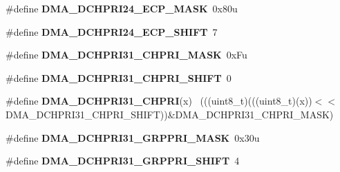 \begin{DoxyCompactItemize}
\item 
\hypertarget{group___d_m_a___register___masks_gab51b5933e6c790902a55a68be57c4868}{}\#define {\bfseries D\+M\+A\+\_\+\+D\+C\+H\+P\+R\+I24\+\_\+\+E\+C\+P\+\_\+\+M\+A\+S\+K}~0x80u\label{group___d_m_a___register___masks_gab51b5933e6c790902a55a68be57c4868}

\item 
\hypertarget{group___d_m_a___register___masks_gaa3c8611d55fcded011a0ee28f9ac3ae9}{}\#define {\bfseries D\+M\+A\+\_\+\+D\+C\+H\+P\+R\+I24\+\_\+\+E\+C\+P\+\_\+\+S\+H\+I\+F\+T}~7\label{group___d_m_a___register___masks_gaa3c8611d55fcded011a0ee28f9ac3ae9}

\item 
\hypertarget{group___d_m_a___register___masks_ga2bbb6a19ae9494615995153e17658fdd}{}\#define {\bfseries D\+M\+A\+\_\+\+D\+C\+H\+P\+R\+I31\+\_\+\+C\+H\+P\+R\+I\+\_\+\+M\+A\+S\+K}~0x\+Fu\label{group___d_m_a___register___masks_ga2bbb6a19ae9494615995153e17658fdd}

\item 
\hypertarget{group___d_m_a___register___masks_ga5eec89c278cd8c360303ef845fb68bb4}{}\#define {\bfseries D\+M\+A\+\_\+\+D\+C\+H\+P\+R\+I31\+\_\+\+C\+H\+P\+R\+I\+\_\+\+S\+H\+I\+F\+T}~0\label{group___d_m_a___register___masks_ga5eec89c278cd8c360303ef845fb68bb4}

\item 
\hypertarget{group___d_m_a___register___masks_gad8c6c7dced3065a9ceb4ce5485962e35}{}\#define {\bfseries D\+M\+A\+\_\+\+D\+C\+H\+P\+R\+I31\+\_\+\+C\+H\+P\+R\+I}(x)                                    ~(((uint8\+\_\+t)(((uint8\+\_\+t)(x))$<$$<$D\+M\+A\+\_\+\+D\+C\+H\+P\+R\+I31\+\_\+\+C\+H\+P\+R\+I\+\_\+\+S\+H\+I\+F\+T))\&D\+M\+A\+\_\+\+D\+C\+H\+P\+R\+I31\+\_\+\+C\+H\+P\+R\+I\+\_\+\+M\+A\+S\+K)\label{group___d_m_a___register___masks_gad8c6c7dced3065a9ceb4ce5485962e35}

\item 
\hypertarget{group___d_m_a___register___masks_ga3a04a3388ccc91a5962691c08822d836}{}\#define {\bfseries D\+M\+A\+\_\+\+D\+C\+H\+P\+R\+I31\+\_\+\+G\+R\+P\+P\+R\+I\+\_\+\+M\+A\+S\+K}~0x30u\label{group___d_m_a___register___masks_ga3a04a3388ccc91a5962691c08822d836}

\item 
\hypertarget{group___d_m_a___register___masks_ga28aaa5368919e4e1d6de1c8479c3081c}{}\#define {\bfseries D\+M\+A\+\_\+\+D\+C\+H\+P\+R\+I31\+\_\+\+G\+R\+P\+P\+R\+I\+\_\+\+S\+H\+I\+F\+T}~4\label{group___d_m_a___register___masks_ga28aaa5368919e4e1d6de1c8479c3081c}


\end{DoxyCompactItemize}
